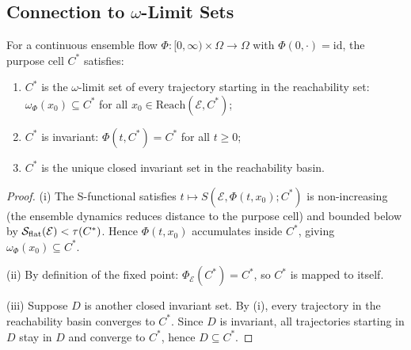 \subsection{Connection to $\omega$-Limit Sets}

\begin{theorem}
\label{thm:omega-limit}
For a continuous ensemble flow $\Phi : [0,\infty) \times \Omega \to \Omega$
with $\Phi(0, \cdot) = \mathrm{id}$, the purpose cell $C^*$ satisfies:
\begin{enumerate}[label=(\roman*)]
  \item $C^*$ is the $\omega$-limit set of every trajectory starting in the
    reachability set: $\omega_\Phi(x_0) \subseteq C^*$ for all
    $x_0 \in \mathrm{Reach}(\mathcal{E}, C^*)$;
  \item $C^*$ is invariant: $\Phi(t, C^*) = C^*$ for all $t \geq 0$;
  \item $C^*$ is the unique closed invariant set in the reachability basin.
\end{enumerate}
\end{theorem}

\begin{proof}
(i) The S-functional satisfies $t \mapsto S(\mathcal{E}, \Phi(t, x_0); C^*)$
is non-increasing (the ensemble dynamics reduces distance to the purpose cell)
and bounded below by $\mathcal{S}_{\mathrm{flat}}(\mathcal{E}) < \tau(C^*)$.  Hence
$\Phi(t, x_0)$ accumulates inside $C^*$, giving $\omega_\Phi(x_0) \subseteq C^*$.

(ii) By definition of the fixed point: $\Phi_\mathcal{E}(C^*) = C^*$, so
$C^*$ is mapped to itself.

(iii) Suppose $D$ is another closed invariant set.  By (i), every trajectory
in the reachability basin converges to $C^*$.  Since $D$ is invariant, all
trajectories starting in $D$ stay in $D$ and converge to $C^*$, hence
$D \subseteq C^*$.
\end{proof}

